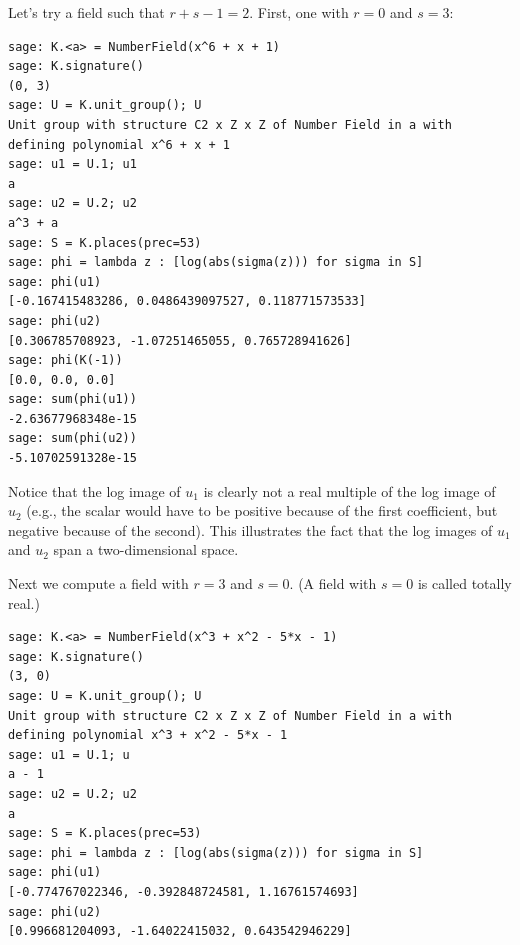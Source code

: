 Let's try a field such that $r+s-1=2$.  First, one with $r=0$ and
$s=3$:
\begin{lstlisting}
sage: K.<a> = NumberField(x^6 + x + 1)
sage: K.signature()
(0, 3)
sage: U = K.unit_group(); U
Unit group with structure C2 x Z x Z of Number Field in a with 
defining polynomial x^6 + x + 1
sage: u1 = U.1; u1
a
sage: u2 = U.2; u2
a^3 + a
sage: S = K.places(prec=53)
sage: phi = lambda z : [log(abs(sigma(z))) for sigma in S]
sage: phi(u1)
[-0.167415483286, 0.0486439097527, 0.118771573533]
sage: phi(u2)
[0.306785708923, -1.07251465055, 0.765728941626]
sage: phi(K(-1))
[0.0, 0.0, 0.0]
sage: sum(phi(u1))
-2.63677968348e-15
sage: sum(phi(u2))
-5.10702591328e-15
\end{lstlisting}

Notice that the log image of $u_1$ is clearly not a real multiple of
the log image of~$u_2$ (e.g., the scalar would have to be positive
because of the first coefficient, but negative because of the second).
This illustrates the fact that the log images of $u_1$ and $u_2$ span
a two-dimensional space.

Next we compute a field with $r=3$ and $s=0$.  (A field with $s=0$
is called totally real.)
\begin{lstlisting}
sage: K.<a> = NumberField(x^3 + x^2 - 5*x - 1)
sage: K.signature()
(3, 0)
sage: U = K.unit_group(); U
Unit group with structure C2 x Z x Z of Number Field in a with 
defining polynomial x^3 + x^2 - 5*x - 1
sage: u1 = U.1; u
a - 1
sage: u2 = U.2; u2
a
sage: S = K.places(prec=53)
sage: phi = lambda z : [log(abs(sigma(z))) for sigma in S]
sage: phi(u1)
[-0.774767022346, -0.392848724581, 1.16761574693]
sage: phi(u2)
[0.996681204093, -1.64022415032, 0.643542946229]
\end{lstlisting}

